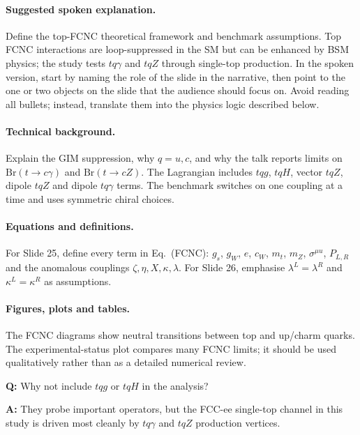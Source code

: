 \documentclass[11pt,a4paper]{report}
\newcommand{\br}{\mathrm{Br}}
\begin{document}
\paragraph{Suggested spoken explanation.}
Define the top-FCNC theoretical framework and benchmark assumptions. Top FCNC interactions are loop-suppressed in the SM but can be enhanced by BSM physics; the study tests $tq\gamma$ and $tqZ$ through single-top production. In the spoken version, start by naming the role of the slide in the narrative, then point to the one or two objects on the slide that the audience should focus on.  Avoid reading all bullets; instead, translate them into the physics logic described below.

\paragraph{Technical background.}
Explain the GIM suppression, why $q=u,c$, and why the talk reports limits on $\br(t\to c\gamma)$ and $\br(t\to cZ)$.  The Lagrangian includes $tqg$, $tqH$, vector $tqZ$, dipole $tqZ$ and dipole $tq\gamma$ terms.  The benchmark switches on one coupling at a time and uses symmetric chiral choices.

\paragraph{Equations and definitions.}
For Slide 25, define every term in Eq.~(FCNC): $g_s$, $g_W$, $e$, $c_W$, $m_t$, $m_Z$, $\sigma^{\mu
u}$, $P_{L,R}$ and the anomalous couplings $\zeta,\eta,X,\kappa,\lambda$.  For Slide 26, emphasise $\lambda^L=\lambda^R$ and $\kappa^L=\kappa^R$ as assumptions.

\paragraph{Figures, plots and tables.}
The FCNC diagrams show neutral transitions between top and up/charm quarks.  The experimental-status plot compares many FCNC limits; it should be used qualitatively rather than as a detailed numerical review.

\begin{questionbox}
\textbf{Q:} Why not include $tqg$ or $tqH$ in the analysis?\par
\textbf{A:} They probe important operators, but the FCC-ee single-top channel in this study is driven most cleanly by $tq\gamma$ and $tqZ$ production vertices.
\end{questionbox}
\end{document}
